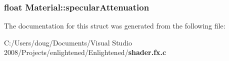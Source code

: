 \subsubsection[{specularAttenuation}]{\setlength{\rightskip}{0pt plus 5cm}float {\bf Material::specularAttenuation}}\label{struct_material_a4580ca0557402f1b992cb8156c535343}


The documentation for this struct was generated from the following file:\begin{DoxyCompactItemize}
\item 
C:/Users/doug/Documents/Visual Studio 2008/Projects/enlightened/Enlightened/{\bf shader.fx.c}\end{DoxyCompactItemize}
